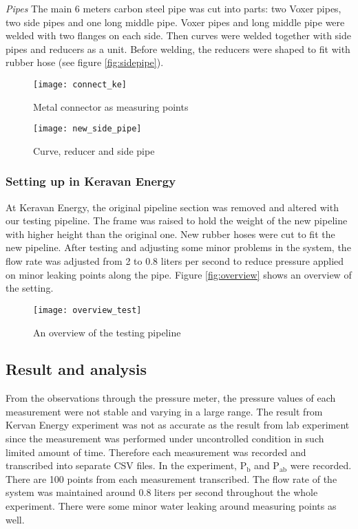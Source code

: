 \textit{Pipes}\newline
The main 6 meters carbon steel pipe was cut into parts: two Voxer pipes, two side pipes and one long middle pipe. Voxer pipes and long middle pipe were welded with two flanges on each side. Then curves were welded together with side pipes and reducers as a unit. Before welding, the reducers were shaped to fit with rubber hose (see figure \vref{fig:sidepipe}).

\begin{figure}[!htb]
   \begin{minipage}{0.48\textwidth}
     \centering
     \texttt{[image: connect\_ke]}
     \caption{Metal connector as measuring points}\label{fig:coke}
   \end{minipage}\hfill
   \begin {minipage}{0.48\textwidth}
     \centering
     \texttt{[image: new\_side\_pipe]}
     \caption{Curve, reducer and side pipe}\label{fig:sidepipe}
   \end{minipage}
\end{figure}

\subsubsection{Setting up in Keravan Energy}

At Keravan Energy, the original pipeline section was removed and altered with our testing pipeline. The frame was raised to hold the weight of the new pipeline with higher height than the original one. New rubber hoses were cut to fit the new pipeline. After testing and adjusting some minor problems in the system, the flow rate was adjusted from 2 to 0.8 liters per second to reduce pressure applied on minor leaking points along the pipe. Figure \vref{fig:overview} shows an overview of the setting.

\begin{figure}[h]
  \centering
  \texttt{[image: overview\_test]}
  \caption{ An overview of the testing pipeline}
  \label{fig:overview}
\end{figure}

\subsection{Result and analysis}

From the observations through the pressure meter, the pressure values of each measurement were not stable and varying in a large range. The result from Kervan Energy experiment was not as accurate as the result from lab experiment since the measurement was performed under uncontrolled condition in such limited amount of time. Therefore each measurement was recorded and transcribed into separate CSV files. In the experiment, P$_{\text{b}}$ and P$_{\text{ab}}$ were recorded. There are 100 points from each measurement transcribed. The flow rate of the system was maintained around 0.8 liters per second throughout the whole experiment. There were some minor water leaking around measuring points as well.

